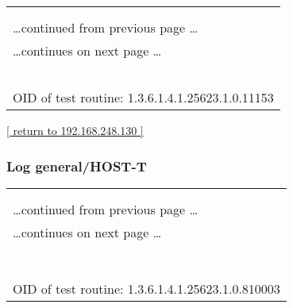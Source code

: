 \documentclass{article}
\begin{document}
\begin{longtable}{|p{}|}
\hline
\rowcolor{openvas_log}{\color{white}{Log (CVSS: 0.0) }}\\
\rowcolor{openvas_log}{\color{white}{NVT: Identify unknown services with 'HELP'}}\\
\hline
\endfirsthead
\hfill\ldots continued from previous page \ldots \\
\hline
\endhead
\hline
\ldots continues on next page \ldots \\
\endfoot
\hline
\endlastfoot
\\
\rowcolor{white}{\verb=Daytime is running on this port=}\\
\rowcolor{white}{\verb==}\\
\rowcolor{white}{\verb==}\\
\\
OID of test routine: 1.3.6.1.4.1.25623.1.0.11153\\
\end{longtable}

\begin{footnotesize}\hyperref[host:192.168.248.130]{[ return to 192.168.248.130 ]}\end{footnotesize}
\subsubsection{Log general/HOST-T}
\label{port:192.168.248.130 general/HOST-T Log}

\begin{longtable}{|p{}|}
\hline
\rowcolor{openvas_log}{\color{white}{Log (CVSS: 0.0) }}\\
\rowcolor{openvas_log}{\color{white}{NVT: Host Summary}}\\
\hline
\endfirsthead
\hfill\ldots continued from previous page \ldots \\
\hline
\endhead
\hline
\ldots continues on next page \ldots \\
\endfoot
\hline
\endlastfoot
\\
\rowcolor{white}{\verb=traceroute:192.168.248.132,192.168.248.130=}\\
\rowcolor{white}{\verb=TCP ports:37,22,113,13=}\\
\rowcolor{white}{\verb=UDP ports:514,68=}\\
\rowcolor{white}{\verb==}\\
\rowcolor{white}{\verb==}\\
\\
OID of test routine: 1.3.6.1.4.1.25623.1.0.810003\\
\end{longtable}
\end{document}
